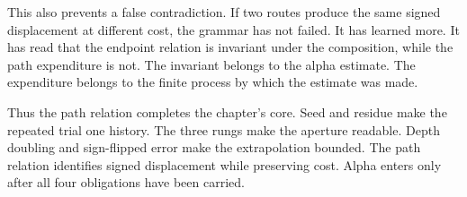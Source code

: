 This also prevents a false contradiction. If two routes produce the same
signed displacement at different cost, the grammar has not failed. It has
learned more. It has read that the endpoint relation is invariant under the
composition, while the path expenditure is not. The invariant belongs to the
alpha estimate. The expenditure belongs to the finite process by which the
estimate was made.

Thus the path relation completes the chapter's core. Seed and residue make
the repeated trial one history. The three rungs make the aperture readable.
Depth doubling and sign-flipped error make the extrapolation bounded. The
path relation identifies signed displacement while preserving cost. Alpha
enters only after all four obligations have been carried.
